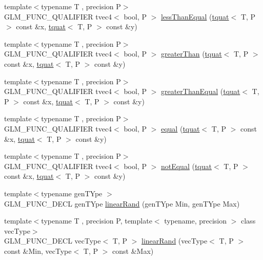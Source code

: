 \begin{DoxyCompactItemize}
\item 
{\footnotesize template$<$typename T , precision P$>$ }\\G\+L\+M\+\_\+\+F\+U\+N\+C\+\_\+\+Q\+U\+A\+L\+I\+F\+I\+E\+R tvec4$<$ bool, P $>$ \hyperlink{group__gtc__quaternion_ga7c81996ed2724f26fe76faf352c76294}{less\+Than\+Equal} (\hyperlink{structglm_1_1tquat}{tquat}$<$ T, P $>$ const \&x, \hyperlink{structglm_1_1tquat}{tquat}$<$ T, P $>$ const \&y)
\item 
{\footnotesize template$<$typename T , precision P$>$ }\\G\+L\+M\+\_\+\+F\+U\+N\+C\+\_\+\+Q\+U\+A\+L\+I\+F\+I\+E\+R tvec4$<$ bool, P $>$ \hyperlink{group__gtc__quaternion_ga09d21a588ae425ac7517ea65cc59a5ae}{greater\+Than} (\hyperlink{structglm_1_1tquat}{tquat}$<$ T, P $>$ const \&x, \hyperlink{structglm_1_1tquat}{tquat}$<$ T, P $>$ const \&y)
\item 
{\footnotesize template$<$typename T , precision P$>$ }\\G\+L\+M\+\_\+\+F\+U\+N\+C\+\_\+\+Q\+U\+A\+L\+I\+F\+I\+E\+R tvec4$<$ bool, P $>$ \hyperlink{group__gtc__quaternion_ga0906a221a2037519fcf316ea5c1e3b3e}{greater\+Than\+Equal} (\hyperlink{structglm_1_1tquat}{tquat}$<$ T, P $>$ const \&x, \hyperlink{structglm_1_1tquat}{tquat}$<$ T, P $>$ const \&y)
\item 
{\footnotesize template$<$typename T , precision P$>$ }\\G\+L\+M\+\_\+\+F\+U\+N\+C\+\_\+\+Q\+U\+A\+L\+I\+F\+I\+E\+R tvec4$<$ bool, P $>$ \hyperlink{group__gtc__quaternion_gac187115710365e0b2902220b9611e7b6}{equal} (\hyperlink{structglm_1_1tquat}{tquat}$<$ T, P $>$ const \&x, \hyperlink{structglm_1_1tquat}{tquat}$<$ T, P $>$ const \&y)
\item 
{\footnotesize template$<$typename T , precision P$>$ }\\G\+L\+M\+\_\+\+F\+U\+N\+C\+\_\+\+Q\+U\+A\+L\+I\+F\+I\+E\+R tvec4$<$ bool, P $>$ \hyperlink{group__gtc__quaternion_ga484c4633f7c05d8e29ee8b452350f539}{not\+Equal} (\hyperlink{structglm_1_1tquat}{tquat}$<$ T, P $>$ const \&x, \hyperlink{structglm_1_1tquat}{tquat}$<$ T, P $>$ const \&y)
\item 
{\footnotesize template$<$typename gen\+T\+Ype $>$ }\\G\+L\+M\+\_\+\+F\+U\+N\+C\+\_\+\+D\+E\+C\+L gen\+T\+Ype \hyperlink{group__gtc__random_ga12aebc19b85a8c736f5801c2f7b9b716}{linear\+Rand} (gen\+T\+Ype Min, gen\+T\+Ype Max)
\item 
{\footnotesize template$<$typename T , precision P, template$<$ typename, precision $>$ class vec\+Type$>$ }\\G\+L\+M\+\_\+\+F\+U\+N\+C\+\_\+\+D\+E\+C\+L vec\+Type$<$ T, P $>$ \hyperlink{group__gtc__random_gaba9cec867916d894d794a32897b7fdfd}{linear\+Rand} (vec\+Type$<$ T, P $>$ const \&Min, vec\+Type$<$ T, P $>$ const \&Max)

\end{DoxyCompactItemize}
